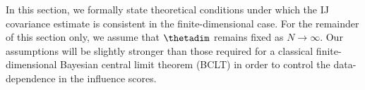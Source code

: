 In this section, we formally state theoretical conditions under which the IJ
covariance estimate is consistent in the finite-dimensional case.  For the
remainder of this section only, we assume that $\thetadim$ remains fixed as $N
\rightarrow \infty$.  Our assumptions will be slightly stronger than those
required for a classical finite-dimensional Bayesian central limit theorem
(BCLT) in order to control the data-dependence in the influence scores.
